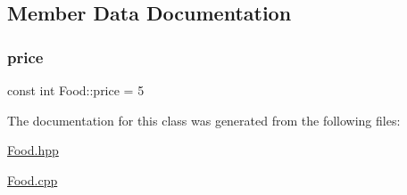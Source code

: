 \subsection{Member Data Documentation}
\mbox{\label{class_food_af54f2090e84e95fcdc95f5c2d93386df}} 
\subsubsection{\texorpdfstring{price}{price}}
{\footnotesize\ttfamily const int Food\+::price = 5\hspace{0.3cm}{\ttfamily [static]}}



The documentation for this class was generated from the following files\+:\begin{DoxyCompactItemize}
\item 
\mbox{\hyperlink{_food_8hpp}{Food.\+hpp}}\item 
\mbox{\hyperlink{_food_8cpp}{Food.\+cpp}}\end{DoxyCompactItemize}
